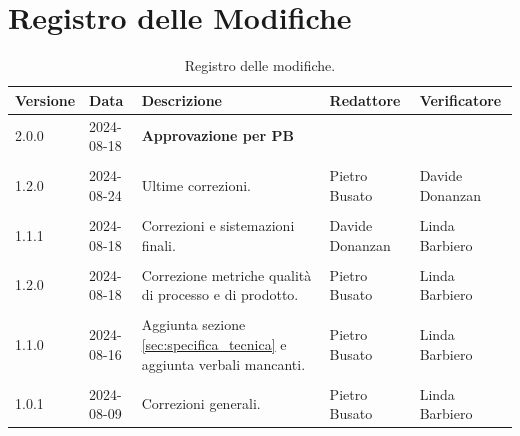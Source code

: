 \documentclass[8pt]{article}
\begin{document}
\section*{Registro delle Modifiche}
\begin{table}[ht!]
    \hypersetup{hidelinks}	
	\centering
	\begin{tabular}{p{1.2cm} p{2cm} p{5cm} p{3cm} p{3cm}}
		\toprule
		\textbf{Versione}& \textbf{Data} & \textbf{Descrizione} & \textbf{Redattore} & \textbf{Verificatore} \\
		\midrule
            2.0.0 & 2024-08-18 & \textbf{Approvazione per PB} & &  \\\\
            1.2.0 & 2024-08-24 & Ultime correzioni. & Pietro Busato & Davide Donanzan \\\\
            1.1.1 & 2024-08-18 & Correzioni e sistemazioni finali. & Davide Donanzan & Linda Barbiero \\\\
            1.2.0 & 2024-08-18 & Correzione metriche qualità di processo e di prodotto. & Pietro Busato & Linda Barbiero \\\\
            1.1.0 & 2024-08-16 & Aggiunta sezione \ref{sec:specifica_tecnica} e aggiunta verbali mancanti. & Pietro Busato & Linda Barbiero \\\\
			1.0.1 & 2024-08-09 & Correzioni generali. & Pietro Busato & Linda Barbiero \\
		\bottomrule
	\end{tabular}
	\caption{Registro delle modifiche.}
	\label{table:Registro delle modifiche}
\end{table}
\clearpage
\end{document}
